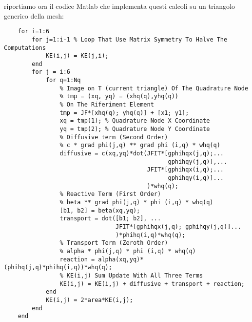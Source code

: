 \documentclass[12pt,a4paper]{report}
\theoremstyle{theorem}
\theoremstyle{theorem}
\theoremstyle{definition}
\begin{document}
riportiamo ora il codice Matlab che implementa questi calcoli su un triangolo generico della mesh:
\begin{lstlisting}[caption=Termini Problemi Ellittico, style=matlab]
% Actual Matrix KE Computation Loop    
    for i=1:6
        for j=1:i-1 % Loop That Use Matrix Symmetry To Halve The Computations
            KE(i,j) = KE(j,i);
        end
        for j = i:6
            for q=1:Nq
                % Image on T (current triangle) Of The Quadrature Node
                % tmp = (xq, yq) = (xhq(q),yhq(q))
                % On The Riferiment Element
                tmp = JF*[xhq(q); yhq(q)] + [x1; y1];
                xq = tmp(1); % Quadrature Node X Coordinate
                yq = tmp(2); % Quadrature Node Y Coordinate
                % Diffusive term (Second Order)
                % c * grad phi(j,q) ** grad phi (i,q) * whq(q)
                diffusive = c(xq,yq)*dot(JFIT*[gphihqx(j,q);... 
                                               gphihqy(j,q)],...
                                         JFIT*[gphihqx(i,q);...
                                               gphihqy(i,q)]...
                                         )*whq(q);
                % Reactive Term (First Order)
                % beta ** grad phi(j,q) * phi (i,q) * whq(q)
                [b1, b2] = beta(xq,yq);
                transport = dot([b1; b2], ...
                                JFIT*[gphihqx(j,q); gphihqy(j,q)]...
                                )*phihq(i,q)*whq(q);
                % Transport Term (Zeroth Order)
                % alpha * phi(j,q) * phi (i,q) * whq(q)
                reaction = alpha(xq,yq)*(phihq(j,q)*phihq(i,q))*whq(q);
                % KE(i,j) Sum Update With All Three Terms
                KE(i,j) = KE(i,j) + diffusive + transport + reaction;            
            end
            KE(i,j) = 2*area*KE(i,j);
        end
    end
\end{lstlisting}
\end{document}
